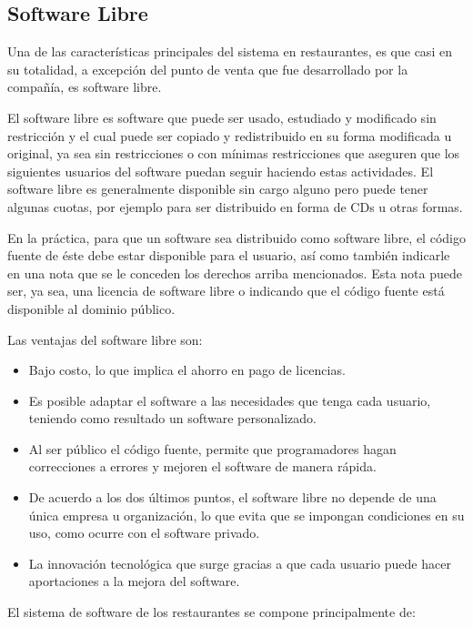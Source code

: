 \subsection{Software Libre}
\label{subsec:software_libre}

Una de las características principales del sistema en restaurantes, es que casi en su totalidad, a excepción del punto de venta que fue desarrollado por la compañía, es software libre.

El software libre es software que puede ser usado, estudiado y modificado sin restricción y el cual puede ser copiado y redistribuido en su forma modificada u original, ya sea sin restricciones o con mínimas restricciones que aseguren que los siguientes usuarios del software puedan seguir haciendo estas actividades. El software libre es generalmente disponible sin cargo alguno pero puede tener algunas cuotas, por ejemplo para ser distribuido en forma de CDs u otras formas.

En la práctica, para que un software sea distribuido como software libre, el código fuente de éste debe estar disponible para el usuario, así como también indicarle en una nota que se le conceden los derechos arriba mencionados. Esta nota puede ser, ya sea, una licencia de software libre o indicando que el código fuente está disponible al dominio público.

Las ventajas del software libre son:

\begin{itemize}
 \item Bajo costo, lo que implica el ahorro en pago de licencias.
 \item Es posible adaptar el software a las necesidades que tenga cada usuario, teniendo como resultado un software personalizado.
 \item Al ser público el código fuente, permite que programadores hagan correcciones a errores y mejoren el software de manera rápida.
 \item De acuerdo a los dos últimos puntos, el software libre no depende de una única empresa u organización, lo que evita que se impongan condiciones en su uso, como ocurre con el software privado.
 \item La innovación tecnológica que surge gracias a que cada usuario puede hacer aportaciones a la mejora del software.
\end{itemize}

El sistema de software de los restaurantes se compone principalmente de:

